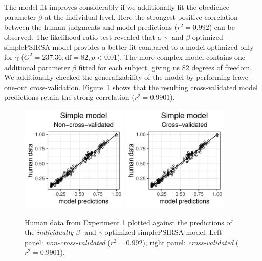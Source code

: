 \documentclass[10pt,a4paper]{article}
\begin{document}
 

The model fit improves considerably if we additionally fit the obedience parameter $\beta$ at the individual level. 
Here the strongest positive correlation between the human judgments and model predictions ($r^2 = 0.992$) can be observed. The likelihood ratio test revealed that a $\gamma$- and $\beta$-optimized simplePSIRSA model provides a better fit compared to a model optimized only for $\gamma$ ($G^2 = 237.36, \textrm{df} = 82, p < 0.01$). The more complex model contains one additional parameter $\beta$ fitted for each subject, giving us 82 degrees of freedom. We additionally checked the generalizability of the model by performing leave-one-out cross-validation. Figure~\ref{cross-validation} shows that the resulting cross-validated model predictions retain the strong correlation ($r^{2}=0.9901$).

\begin{figure}[ht]
	\centering
	\includegraphics[width=2in]{images/m5.pdf}
	\includegraphics[width=2in]{images/m8.pdf}
	\caption{Human data from Experiment 1 plotted against the predictions of the \emph{individually} $\beta$- and $\gamma$-optimized simplePSIRSA model. Left panel: \emph{non-cross-validated} ($r^{2}=0.992$); right panel: \emph{cross-validated} ($r^{2}=0.9901$).}\label{cross-validation}
\end{figure}
\end{document}
